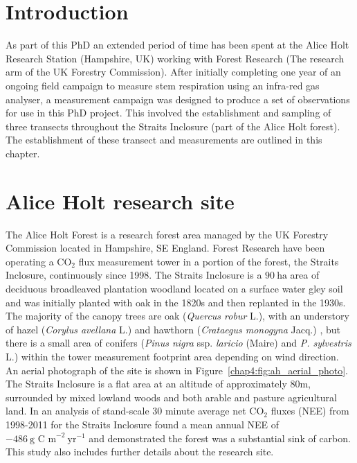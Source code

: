 
\section{Introduction}

As part of this PhD an extended period of time has been spent at the Alice Holt Research Station (Hampshire, UK) working with Forest Research (The research arm of the UK Forestry Commission). After initially completing one year of an ongoing field campaign to measure stem respiration using an infra-red gas analyser, a measurement campaign was designed to produce a set of observations for use in this PhD project. This involved the establishment and sampling of three transects throughout the Straits Inclosure (part of the Alice Holt forest). The establishment of these transect and measurements are outlined in this chapter.


\section{Alice Holt research site} \label{chap4:sec:aliceholt}

The Alice Holt Forest is a research forest area managed by the UK Forestry Commission located in Hampshire, SE England. Forest Research have been operating a $\text{CO}_{2}$ flux measurement tower in a portion of the forest, the Straits Inclosure, continuously since 1998. The Straits Inclosure is a $90~\text{ha}$ area of deciduous broadleaved plantation woodland located on a surface water gley soil and was initially planted with oak in the 1820s \citep{schlich1905working} and then replanted in the 1930s. The majority of the canopy trees are oak (\textit{Quercus robur} L.), with an understory of hazel (\textit{Corylus avellana} L.) and hawthorn (\textit{Crataegus monogyna} Jacq.) \citep{pitman2001leaf}, but there is a small area of conifers (\textit{Pinus nigra} ssp. \textit{laricio} (Maire) and \textit{P. sylvestris} L.) within the tower measurement footprint area depending on wind direction. An aerial photograph of the site is shown in Figure~\ref{chap4:fig:ah_aerial_photo}. The Straits Inclosure is a flat area at an altitude of approximately 80m, surrounded by mixed lowland woods and both arable and pasture agricultural land. In \citet{wilkinson2012inter} an analysis of stand-scale $30$ minute average net $\text{CO}_{2}$ fluxes (NEE) from 1998-2011 for the Straits Inclosure found a mean annual NEE of \(-486~\text{g C m}^{-2}~\text{yr}^{-1}\) and demonstrated the forest was a substantial sink of carbon. This study also includes further details about the research site. 

